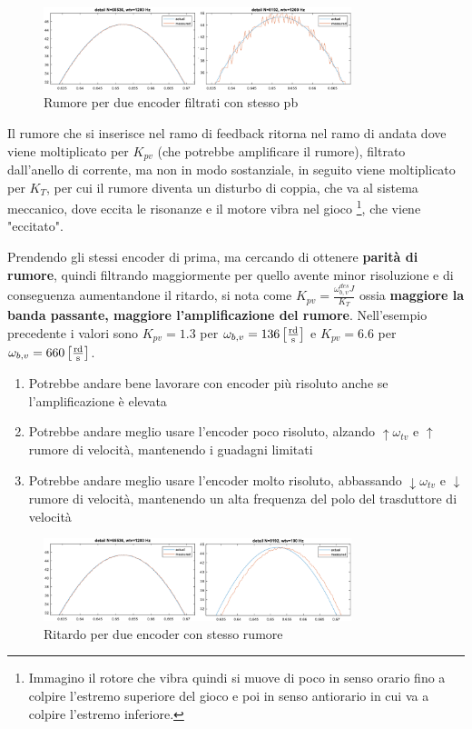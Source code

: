 \begin{figure}[h]
    \centering
    \includegraphics[width=0.8\textwidth]{Immagini/encoder1vs1_stesso_filtro.png}
    \caption{Rumore per due encoder filtrati con stesso pb}
\end{figure}

Il rumore che si inserisce nel ramo di feedback ritorna nel ramo di andata dove viene moltiplicato per \(K_{pv}\) (che potrebbe amplificare il rumore), filtrato dall'anello di corrente, ma non in modo sostanziale, in seguito viene moltiplicato per \(K_T\), per cui il rumore diventa un disturbo di coppia, che va al sistema meccanico, dove eccita le risonanze e il motore vibra nel gioco \footnote{Immagino il rotore che vibra quindi si muove di poco in senso orario fino a colpire l'estremo superiore del gioco e poi in senso antiorario in cui va a colpire l'estremo inferiore.}, che viene "eccitato".

Prendendo gli stessi encoder di prima, ma cercando di ottenere \textbf{parità di rumore}, quindi filtrando maggiormente per quello avente minor risoluzione e di conseguenza aumentandone il ritardo, si nota come \(K_{pv}=\frac{\omega_{b,v}^{des}J}{K_T}\) ossia \textbf{maggiore la banda passante, maggiore l'amplificazione del rumore}. Nell'esempio precedente i valori sono \(K_{pv}=1.3\) per \(\omega_{b,v}=136 \left[\frac{\text{rd}}{\text{s}}\right]\) e \(K_{pv}=6.6\) per \(\omega_{b,v}=660 \left[\frac{\text{rd}}{\text{s}}\right]\).

\begin{enumerate}
    \item Potrebbe andare bene lavorare con encoder più risoluto anche se l'amplificazione è elevata
    \item Potrebbe andare meglio usare l'encoder poco risoluto, alzando \(\uparrow \omega_{tv}\) e \(\uparrow\) rumore di velocità, mantenendo i guadagni limitati
    \item Potrebbe andare meglio usare l'encoder molto risoluto, abbassando \(\downarrow \omega_{tv}\) e \(\downarrow\) rumore di velocità, mantenendo un alta frequenza del polo del trasduttore di velocità
\end{enumerate}

\begin{figure}[h]
    \centering
    \includegraphics[width=0.8\textwidth]{Immagini/encoder1vs1_stesso_rumore.png}
    \caption{Ritardo per due encoder con stesso rumore}
\end{figure}

